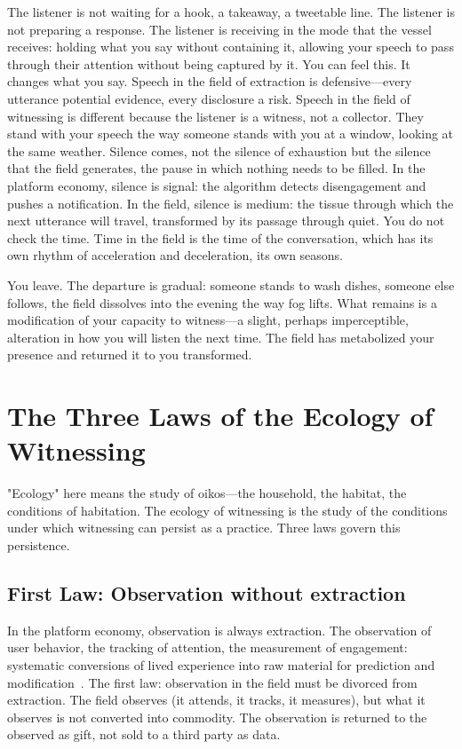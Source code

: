 The listener is not waiting for a hook, a takeaway, a tweetable line. The listener is not preparing a response. The listener is receiving in the mode that the vessel receives: holding what you say without containing it, allowing your speech to pass through their attention without being captured by it. You can feel this. It changes what you say. Speech in the field of extraction is defensive---every utterance potential evidence, every disclosure a risk. Speech in the field of witnessing is different because the listener is a witness, not a collector. They stand with your speech the way someone stands with you at a window, looking at the same weather. Silence comes, not the silence of exhaustion but the silence that the field generates, the pause in which nothing needs to be filled. In the platform economy, silence is signal: the algorithm detects disengagement and pushes a notification. In the field, silence is medium: the tissue through which the next utterance will travel, transformed by its passage through quiet. You do not check the time. Time in the field is the time of the conversation, which has its own rhythm of acceleration and deceleration, its own seasons.

You leave. The departure is gradual: someone stands to wash dishes, someone else follows, the field dissolves into the evening the way fog lifts. What remains is a modification of your capacity to witness---a slight, perhaps imperceptible, alteration in how you will listen the next time. The field has metabolized your presence and returned it to you transformed.

\section{The Three Laws of the Ecology of Witnessing}

"Ecology" here means the study of oikos---the household, the habitat, the conditions of habitation. The ecology of witnessing is the study of the conditions under which witnessing can persist as a practice. Three laws govern this persistence.

\subsection{First Law: Observation without extraction}

In the platform economy, observation is always extraction. The observation of user behavior, the tracking of attention, the measurement of engagement: systematic conversions of lived experience into raw material for prediction and modification~\cite{zuboff2019,beller2006}. The first law: observation in the field must be divorced from extraction. The field observes (it attends, it tracks, it measures), but what it observes is not converted into commodity. The observation is returned to the observed as gift, not sold to a third party as data.

